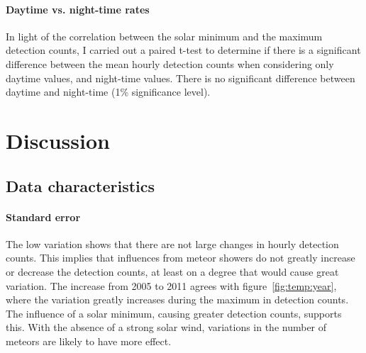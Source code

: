 \paragraph{Daytime vs. night-time rates\\}
In light of the correlation between the solar minimum and the maximum detection counts, I carried out a paired t-test to determine if there is a significant difference between the mean hourly detection counts when considering only daytime values, and night-time values. There is no significant difference between daytime and night-time (1\% significance level). 
\section{Discussion}
\subsection{Data characteristics}
\paragraph{Standard error\\}
The low variation shows that there are not large changes in hourly detection counts. This implies that influences from meteor showers do not greatly increase or decrease the detection counts, at least on a degree that would cause great variation. The increase from 2005 to 2011 agrees with figure~\ref{fig:temp:year}, where the variation greatly increases during the maximum in detection counts. The influence of a solar minimum, causing greater detection counts, supports this. With the absence of a strong solar wind, variations in the number of meteors are likely to have more effect.
